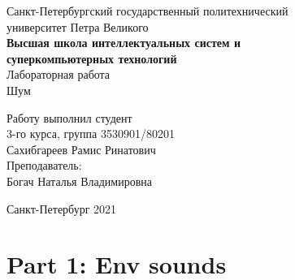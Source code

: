 \documentclass[a4paper]{article}
\begin{document}
    \begin{center}
        \begin{center}
        \hfill \break
        \normalsize{Санкт-Петербургский государственный политехнический}\\
        \normalsize{университет Петра Великого}\\
        \hfill \break
        \normalsize{\textbf{Высшая школа интеллектуальных систем и}}\\ 
        \normalsize{\textbf{суперкомпьютерных технологий}}\\ 
        \hfill \break
        \hfill \break
        \hfill \break
        \normalsize{Лабораторная работа}\\
        \hfill \break
        \hfill \break
        \normalsize{\LARGE Шум}\\
        \end{center}
        \hfill \break
        \hfill \break
        \hfill \break
        \hfill \break
        \hfill \break
        \hfill \break
        \hfill \break
        \hfill \break
        \hfill \break
        \hfill \break
        \begin{flushright}
            \normalsize{Работу выполнил студент}\\
            \normalsize{3-го курса, группа 3530901/80201}\\
            \normalsize{Сахибгареев Рамис Ринатович}\\
            \hfill \break
            \normalsize{Преподаватель:}\\
            \normalsize{Богач Наталья Владимировна}\\
        \end{flushright}
        \hfill \break
        \hfill \break
        \hfill \break
        \hfill \break
        \begin{center} Санкт-Петербург 2021 \end{center}
        \thispagestyle{empty}
    \end{center}
    
    \newpage
        \tableofcontents
    
    \newpage
         \listoffigures
    
    \newpage
         \lstlistoflistings   
     
    \newpage
        \section{Part 1: Env sounds}
        
\end{document}
